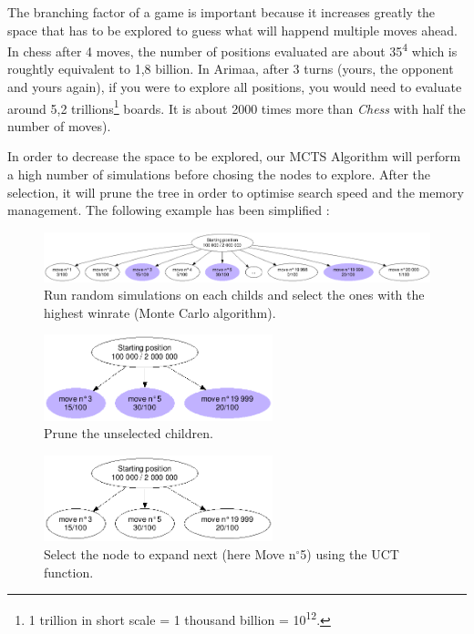 The branching factor of a game is important because it increases greatly the space that has to be explored to guess what will happend multiple moves ahead. In chess after 4 moves, the number of positions evaluated are about 35\textsuperscript{4} which is roughtly equivalent to 1,8 billion. In Arimaa, after 3 turns (yours, the opponent and yours again), if you were to explore all positions, you would need to evaluate around 5,2 trillions\footnote{1 trillion in short scale = 1 thousand billion = 10\textsuperscript{12}.} boards. It is about 2000 times more than \textit{Chess} with half the number of moves).

In order to decrease the space to be explored, our MCTS Algorithm will perform a high number of simulations before chosing the nodes to explore. After the selection, it will prune the tree in order to optimise search speed and the memory management. The following example has been simplified :
\begin{figure}[H]
\centering
	\includegraphics[width=\textwidth]{3Methods/3.2MCTS/img/root.png}
	\caption{\label{fig:roottree}Run random simulations on each childs and select the ones with the highest winrate (Monte Carlo algorithm).}
\end{figure}

\begin{figure}[H]
\centering
	\includegraphics[height=2.5cm]{3Methods/3.2MCTS/img/prune.png}
	\caption{\label{fig:prune}Prune the unselected children.}
\end{figure}

\begin{figure}[H]
\centering
	\includegraphics[height=2.5cm]{3Methods/3.2MCTS/img/prune-clean.png}
	\caption{\label{fig:prune-clean}Select the node to expand next (here Move n$^{\circ}$5) using the UCT function.}
\end{figure}


